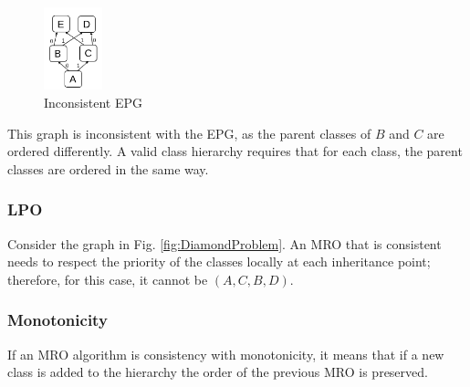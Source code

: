 \documentclass[runningheads]{llncs}
\begin{document}
\begin{figure}[htbp]
  \centering
  \includegraphics[width=0.15\textwidth]{images/NoneEPG.png}
  \caption{Inconsistent EPG}
  \label{fig:C3Diagram}
\end{figure}

This graph is inconsistent with the EPG, as the parent classes of $B$ and $C$ are ordered differently. A valid class hierarchy requires that for each class, the parent classes are ordered in the same way.
\subsubsection{LPO}
Consider the graph in Fig. \ref{fig:DiamondProblem}. An MRO that is consistent needs to respect the priority of the classes locally at each inheritance point; therefore, for this case, it cannot be $(A, C, B, D)$.
\subsubsection{Monotonicity}
If an MRO algorithm is consistency with monotonicity, it means that if a new class is added to the hierarchy the order of the previous MRO is preserved.
\end{document}
